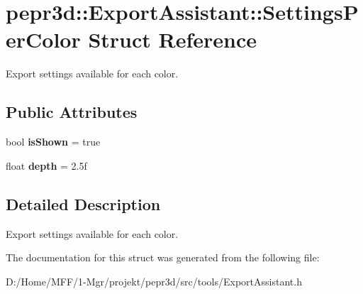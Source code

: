 \hypertarget{structpepr3d_1_1_export_assistant_1_1_settings_per_color}{}\section{pepr3d\+::Export\+Assistant\+::Settings\+Per\+Color Struct Reference}
\label{structpepr3d_1_1_export_assistant_1_1_settings_per_color}


Export settings available for each color.  


\subsection*{Public Attributes}
\begin{DoxyCompactItemize}
\item 
\mbox{\label{structpepr3d_1_1_export_assistant_1_1_settings_per_color_ac3fbb6b5225135e4280abc462b34db20}} 
bool {\bfseries is\+Shown} = true
\item 
\mbox{\label{structpepr3d_1_1_export_assistant_1_1_settings_per_color_af263ed7bd5fa9a913283e276616839b2}} 
float {\bfseries depth} = 2.\+5f
\end{DoxyCompactItemize}


\subsection{Detailed Description}
Export settings available for each color. 

The documentation for this struct was generated from the following file\+:\begin{DoxyCompactItemize}
\item 
D\+:/\+Home/\+M\+F\+F/1-\/\+Mgr/projekt/pepr3d/src/tools/Export\+Assistant.\+h\end{DoxyCompactItemize}
